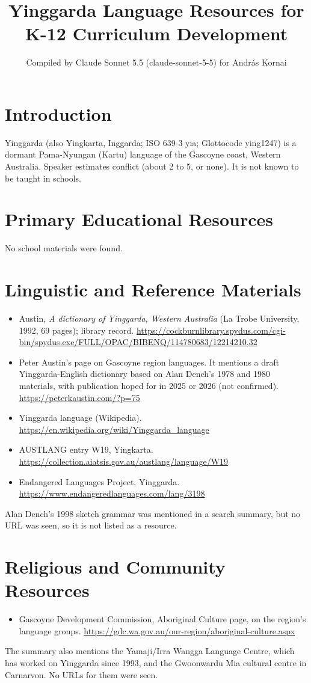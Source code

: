 \documentclass[12pt]{article}
\title{Yinggarda Language Resources for K-12 Curriculum Development}
\author{Compiled by Claude Sonnet 5.5 (claude-sonnet-5-5) for Andr\'as Kornai}
\date{}
\begin{document}
\maketitle

\section{Introduction}
Yinggarda (also Yingkarta, Inggarda; ISO 639-3 yia; Glottocode ying1247) is a dormant Pama-Nyungan (Kartu) language of the Gascoyne coast, Western Australia. Speaker estimates conflict (about 2 to 5, or none). It is not known to be taught in schools.

\section{Primary Educational Resources}
No school materials were found.

\section{Linguistic and Reference Materials}
\begin{itemize}
\item Austin, \emph{A dictionary of Yinggarda, Western Australia} (La Trobe University, 1992, 69 pages); library record. \url{https://cockburnlibrary.spydus.com/cgi-bin/spydus.exe/FULL/OPAC/BIBENQ/114780683/12214210,32}
\item Peter Austin's page on Gascoyne region languages. It mentions a draft Yinggarda-English dictionary based on Alan Dench's 1978 and 1980 materials, with publication hoped for in 2025 or 2026 (not confirmed). \url{https://peterkaustin.com/?p=75}
\item Yinggarda language (Wikipedia). \url{https://en.wikipedia.org/wiki/Yinggarda_language}
\item AUSTLANG entry W19, Yingkarta. \url{https://collection.aiatsis.gov.au/austlang/language/W19}
\item Endangered Languages Project, Yinggarda. \url{https://www.endangeredlanguages.com/lang/3198}
\end{itemize}
Alan Dench's 1998 sketch grammar was mentioned in a search summary, but no URL was seen, so it is not listed as a resource.

\section{Religious and Community Resources}
\begin{itemize}
\item Gascoyne Development Commission, Aboriginal Culture page, on the region's language groups. \url{https://gdc.wa.gov.au/our-region/aboriginal-culture.aspx}
\end{itemize}
The summary also mentions the Yamaji/Irra Wangga Language Centre, which has worked on Yinggarda since 1993, and the Gwoonwardu Mia cultural centre in Carnarvon. No URLs for them were seen.
\end{document}
